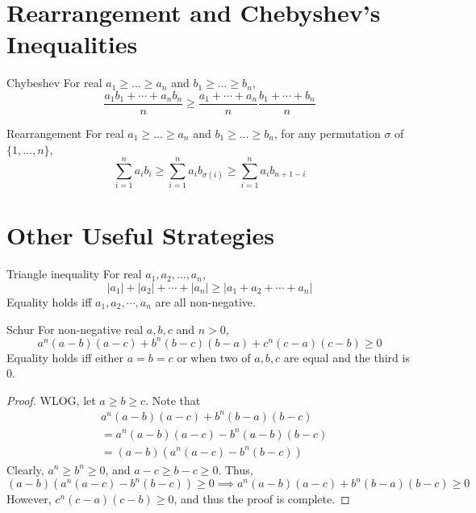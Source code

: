 \section{Rearrangement and Chebyshev's Inequalities}
\begin{thrm}{Chybeshev}{}
For real $a_1\ge\dots\ge a_n$ and $b_1\ge\dots\ge b_n$,
\begin{equation}
\frac{a_1b_1+\cdots+a_nb_n}{n} \ge \frac{a_1+\cdots+a_n}{n} \frac{b_1+\cdots+b_n}{n}
\end{equation}
\end{thrm}

\begin{thrm}{Rearrangement}{}
For real $a_1\ge\dots\ge a_n$ and $b_1\ge\dots\ge b_n$, for any permutation $\sigma$ of $\{1,\dots,n\}$, 
\begin{equation}
\sum_{i=1}^n a_ib_i \ge \sum_{i=1}^n a_ib_{\sigma(i)} \ge \sum_{i=1}^n a_ib_{n+1-i}
\end{equation}
\end{thrm}

\section{Other Useful Strategies}
\begin{thrm}{Triangle inequality}{}
For real  $a_1, a_2, \dots , a_n$, 
\begin{equation} |a_1| + |a_2| + \cdots + |a_n| \ge |a_1 + a_2 + \cdots + a_n| \end{equation} 
Equality holds iff $a_1, a_2, \cdots, a_n$ are all non-negative. \end{thrm}

\begin{thrm}{Schur}{}
For non-negative real $a,b,c$ and $n>0$, 
\begin{equation} a^n (a-b)(a-c) + b^n (b-c)(b-a) + c^n (c-a)(c-b) \ge 0 \end{equation} 
Equality holds iff either $a=b=c$ or when two of $a,b,c$ are equal and the third is $0$.
\end{thrm}

\begin{proof}
WLOG, let ${a\ge b\ge c}$. 
Note that 
\begin{align*}
    &a^n(a-b)(a-c)+b^n(b-a)(b-c) \\
    &= a^n(a-b)(a-c)-b^n(a-b)(b-c) \\
    &= (a-b)(a^n(a-c)-b^n(b-c))
\end{align*}
Clearly, $a^n\ge b^n \ge 0$, and $a-c \ge b-c \ge 0$. Thus, 
\[ (a-b)(a^n(a-c)-b^n(b-c)) \ge 0 \implies a^n(a-b)(a-c)+b^n(b-a)(b-c) \ge 0 \]
However, $c^n(c-a)(c-b) \ge 0$, and thus the proof is complete.
\end{proof}

